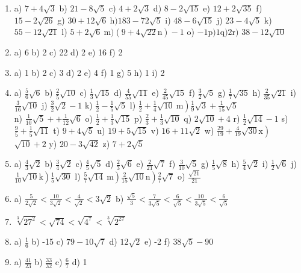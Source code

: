 \documentclass[10pt]{article}
\begin{document}
\begin{enumerate}
  \item a) \(7+4 \sqrt{3}\) b) \(21-8 \sqrt{5}\) c) \(4+2 \sqrt{3}\) d) \(8-2 \sqrt{15}\) e) \(12+2 \sqrt{35}\) f) \(15-2 \sqrt{26}\) g) \(30+12 \sqrt{6} \mathrm{~h}) 183-72 \sqrt{5}\) i) \(48-6 \sqrt{15}\) j) \(23-4 \sqrt{5}\) k) \(55-12 \sqrt{21}\) l) \(5+2 \sqrt{6} \mathrm{~m})(9+4 \sqrt{22} \mathrm{n})-1\) o) \(-1 \mathrm{p}) 1 \mathrm{q}) 2 \mathrm{r})\) \(38-12 \sqrt{10}\)
  \item a) 6 b) 2 c) 22 d) 2 e) 16 f) 2
  \item a) 1 b) 2 c) 3 d) 2 e) 4 f) 1 g) 5 h) 1 i) 2
  \item a) \(\frac{5}{6} \sqrt{6}\) b) \(\frac{2}{5} \sqrt{10}\) c) \(\frac{1}{3} \sqrt{15}\) d) \(\frac{4}{55} \sqrt{11}\) e) \(\frac{2}{45} \sqrt{15}\) f) \(\frac{3}{2} \sqrt{5}\) g) \(\frac{1}{7} \sqrt{35}\) h) \(\frac{2}{35} \sqrt{21}\) i) \(\frac{3}{16} \sqrt{10}\) j) \(\frac{3}{2} \sqrt{2}-1\) k) \(\frac{1}{2}-\frac{1}{5} \sqrt{5}\) l) \(\left.\frac{1}{2}+\frac{1}{4} \sqrt{10} \mathrm{~m}\right) \frac{1}{9} \sqrt{3}+\frac{1}{15} \sqrt{5}\)\\
n) \(\frac{1}{10} \sqrt{5}++\frac{1}{12} \sqrt{6}\) o) \(\frac{1}{2}+\frac{1}{3} \sqrt{15}\) p) \(\frac{2}{3}+\frac{1}{3} \sqrt{10}\) q) \(2 \sqrt{10}+4\) r) \(\frac{1}{2} \sqrt{14}-1\) s) \(\frac{9}{5}+\frac{1}{5} \sqrt{11}\) t) \(9+4 \sqrt{5}\) u) \(19+5 \sqrt{15}\) v) \(16+11 \sqrt{2}\) w) \(\left.\frac{29}{19}+\frac{4}{19} \sqrt{30} \mathrm{x}\right)\) \(\sqrt{10}+2\) y) \(20-3 \sqrt{42}\) z) \(7+2 \sqrt{5}\)
  \item a) \(\frac{4}{3} \sqrt{2}\) b) \(\frac{3}{4} \sqrt{2}\) c) \(\frac{4}{5} \sqrt{5}\) d) \(\frac{2}{3} \sqrt{6}\) e) \(\frac{2}{21} \sqrt{7}\) f) \(\frac{3}{10} \sqrt{5}\) g) \(\frac{1}{5} \sqrt{8}\) h) \(\frac{5}{4} \sqrt{2}\) i) \(\frac{1}{2} \sqrt{6}\) j) \(\left.\frac{1}{10} \sqrt{10} \mathrm{k}\right) \frac{1}{5} \sqrt{30}\) l) \(\left.\left.\frac{5}{7} \sqrt{14} \mathrm{~m}\right) \frac{2}{15} \sqrt{10} \mathrm{n}\right) \frac{2}{7} \sqrt{7}\) o) \(\frac{\sqrt{21}}{21}\)
  \item a) \(\frac{5}{2 \sqrt{2}}<\frac{10}{3 \sqrt{2}}<\frac{4}{\sqrt{2}}<3 \sqrt{2}\) b) \(\frac{\sqrt{5}}{3}<\frac{7}{3 \sqrt{5}}<\frac{6}{\sqrt{5}}<\frac{10}{3 \sqrt{5}}<\frac{6}{\sqrt{5}}\)
  \item \(\sqrt[3]{27^{2}}<\sqrt{74}<\sqrt{4^{7}}<\sqrt[3]{2^{27}}\)
  \item a) \(\frac{1}{6}\) b) -15 c) \(79-10 \sqrt{7}\) d) \(12 \sqrt{2}\) e) -2 f) \(38 \sqrt{5}-90\)
  \item a) \(\frac{41}{23}\) b) \(\frac{33}{32}\) c) \(\frac{6}{7}\) d) 1

\end{enumerate}
\end{document}
